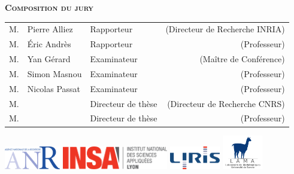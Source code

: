 \begin{titlepage}
\begin{addmargin}[-3.5cm]{-3cm}
\begin{center}



        \vfill

        \textbf{\textsc{Composition du jury}}\\ \medskip

        \begin{table}[h]
	\begin{tabular}{@{}lllr@{}}
	\hline
	M. & Pierre Alliez  & Rapporteur  & (Directeur de Recherche INRIA) \\
	M. & Éric Andrès 	  & Rapporteur  & (Professeur) \\
	M. & Yan Gérard     & Examinateur & (Maître de Conférence) \\
	M. & Simon Masnou   & Examinateur & (Professeur) \\
	M. & Nicolas Passat & Examinateur & (Professeur) \\
	M. & \thesisFirstSupervisor & Directeur de thèse & (Directeur de Recherche CNRS) \\
	M. & \thesisSecondSupervisor & Directeur de thèse & (Professeur) \\
	\end{tabular}
	\end{table}

	{
	\includegraphics[height=1cm]{gfx/Logo_ANR}
	\includegraphics[height=1cm]{gfx/Logo_INSALyon}
	\includegraphics[height=1cm]{gfx/Logo_LIRIS}
	\includegraphics[height=1.5cm]{gfx/Logo_LAMA}
	}

    \end{center}
  \end{addmargin}
\end{titlepage}

